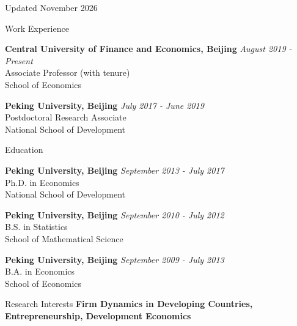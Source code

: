 \documentclass{resume} %
\begin{document}
\begin{center}Updated November 2026\end{center}
\pagestyle{plain}


\begin{rSection}{Work Experience}

{\bf Central University of Finance and Economics, Beijing} \hfill {\em August 2019 - Present} 
\\ Associate Professor (with tenure)
\\ School of Economics

{\bf Peking University, Beijing} \hfill {\em July 2017 - June 2019} 
\\ Postdoctoral Research Associate 
\\ National School of Development
\end{rSection}

\begin{rSection}{Education}

{\bf Peking University, Beijing} \hfill {\em September 2013 - July 2017} 
\\ Ph.D. in Economics
\\ National School of Development

{\bf Peking University, Beijing} \hfill {\em September 2010 - July 2012} 
\\ B.S. in Statistics
\\ School of Mathematical Science

{\bf Peking University, Beijing} \hfill {\em September 2009 - July 2013} 
\\ B.A. in Economics
\\ School of Economics
\end{rSection}

\begin{rSection}{Research Interests}
{\bf Firm Dynamics in Developing Countries, Entrepreneurship, Development Economics} 
\end{rSection}

\end{document}
